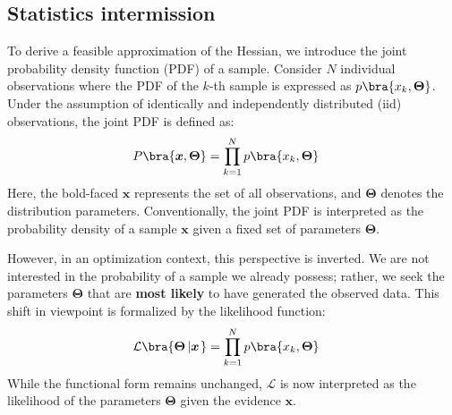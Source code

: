 \subsection{Statistics intermission}
To derive a feasible approximation of the Hessian, we introduce the joint probability density function (PDF) of a sample. Consider $N$ individual observations where the PDF of the $k$-th sample is expressed as $p\bra{x_k, \boldsymbol{\Theta}}$. Under the assumption of identically and independently distributed (iid) observations, the joint PDF is defined as:
\begin{align}
	\label{eq:pdf}
	P\bra{\boldsymbol{x}, \boldsymbol{\Theta}}&=\prod\limits_{k=1}^{N}p\bra{x_k, \boldsymbol{\Theta}}
\end{align}
Here, the bold-faced $\boldsymbol{x}$ represents the set of all observations, and $\boldsymbol{\Theta}$ denotes the distribution parameters. Conventionally, the joint PDF is interpreted as the probability density of a sample $\boldsymbol{x}$ given a fixed set of parameters $\boldsymbol{\Theta}$.\par
However, in an optimization context, this perspective is inverted. We are not interested in the probability of a sample we already possess; rather, we seek the parameters $\boldsymbol{\Theta}$ that are \textbf{most likely} to have generated the observed data. This shift in viewpoint is formalized by the likelihood function:
\begin{align}
	\label{eq:likelihood}
	\mathcal{L}\bra{\boldsymbol{\Theta} \left| \boldsymbol{x} \right.}&=\prod\limits_{k=1}^{N}p\bra{x_k, \boldsymbol{\Theta}}
\end{align}
While the functional form remains unchanged, $\mathcal{L}$ is now interpreted as the likelihood of the parameters $\boldsymbol{\Theta}$ given the evidence $\boldsymbol{x}$.

